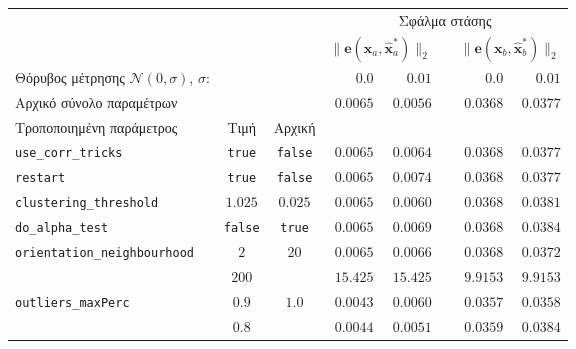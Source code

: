 \begin{table*}\centering
\begin{tabular}{lccrrrrr}

  & & & \multicolumn{5}{c}{Σφάλμα στάσης} \\
                                      &                 &                 & \multicolumn{2}{c}{$\|\bm{e}(\bm{x}_a,\hat{\bm{x}}_a^\ast)\|_2$} &          & \multicolumn{2}{c}{$\|\bm{e}(\bm{x}_b,\hat{\bm{x}}_b^\ast)\|_2$} \\ \toprule
  Θόρυβος μέτρησης $\mathcal{N}(0,\sigma)$, $\sigma$: & &                 & $0.0$             & $0.01$        &  & $0.0$            & $0.01$     \\
  Αρχικό σύνολο παραμέτρων            &                 &                 & $0.0065$        & $0.0056$        &  & $0.0368$         & $0.0377$   \\
  Τροποποιημένη παράμετρος            & Τιμή            & Αρχική          &                 &                 &  &                  &            \\ \midrule
  \texttt{use\_corr\_tricks}          & \texttt{true}   & \texttt{false}  & $0.0065$        & $0.0064$        &  & $0.0368$         & $0.0377$   \\
  \texttt{restart}                    & \texttt{true}   & \texttt{false}  & $0.0065$        & $0.0074$        &  & $0.0368$         & $0.0377$   \\
  \texttt{clustering\_threshold}      & $1.025$         & $0.025$         & $0.0065$        & $0.0060$        &  & $0.0368$         & $0.0381$   \\
  \texttt{do\_alpha\_test}            & \texttt{false}  & \texttt{true}   & $0.0065$        & $0.0069$        &  & $0.0368$         & $0.0384$   \\
  \texttt{orientation\_neighbourhood} & $2$             & $20$            & $0.0065$        & $0.0066$        &  & $0.0368$         & $0.0372$   \\
                                      & $200$           &                 & $15.425$        & $15.425$        &  & $9.9153$         & $9.9153$   \\
  \texttt{outliers\_maxPerc}          & $0.9$           & $1.0$           & $0.0043$        & $0.0060$        &  & $0.0357$         & $0.0358$   \\
                                      & $0.8$           &                 & $0.0044$        & $0.0051$        &  & $0.0359$         & $0.0384$   \\

\end{tabular}
\end{table*}
